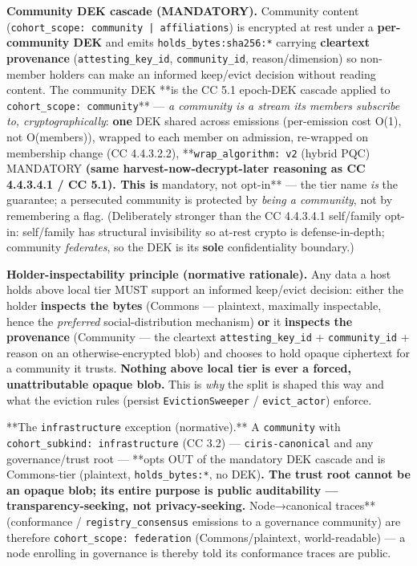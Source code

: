 \documentclass[11pt]{article}
\begin{document}
\textbf{Community DEK cascade (MANDATORY).} Community content (\texttt{cohort\_scope: community | affiliations}) is encrypted at rest under a \textbf{per-community DEK} and emits \texttt{holds\_bytes:sha256:*} carrying \textbf{cleartext provenance} (\texttt{attesting\_key\_id}, \texttt{community\_id}, reason/dimension) so non-member holders can make an informed keep/evict decision without reading content. The community DEK **is the CC 5.1 epoch-DEK cascade applied to \texttt{cohort\_scope: community}** — \textit{a community is a stream its members subscribe to, cryptographically}: \textbf{one} DEK shared across emissions (per-emission cost O(1), not O(members)), wrapped to each member on admission, re-wrapped on membership change (CC 4.4.3.2.2), **\texttt{wrap\_algorithm: v2} (hybrid PQC) MANDATORY\textbf{ (same harvest-now-decrypt-later reasoning as CC 4.4.3.4.1 / CC 5.1). This is }mandatory, not opt-in** — the tier name \textit{is} the guarantee; a persecuted community is protected by \textit{being a community}, not by remembering a flag. (Deliberately stronger than the CC 4.4.3.4.1 self/family opt-in: self/family has structural invisibility so at-rest crypto is defense-in-depth; community \textit{federates}, so the DEK is its \textbf{sole} confidentiality boundary.)


\textbf{Holder-inspectability principle (normative rationale).} Any data a host holds above local tier MUST support an informed keep/evict decision: either the holder \textbf{inspects the bytes} (Commons — plaintext, maximally inspectable, hence the \textit{preferred} social-distribution mechanism) \textbf{or} it \textbf{inspects the provenance} (Community — the cleartext \texttt{attesting\_key\_id} + \texttt{community\_id} + reason on an otherwise-encrypted blob) and chooses to hold opaque ciphertext for a community it trusts. \textbf{Nothing above local tier is ever a forced, unattributable opaque blob.} This is \textit{why} the split is shaped this way and what the eviction rules (persist \texttt{EvictionSweeper} / \texttt{evict\_actor}) enforce.


**The \texttt{infrastructure} exception (normative).** A \texttt{community} with \texttt{cohort\_subkind: infrastructure} (CC 3.2) — \texttt{ciris-canonical} and any governance/trust root — **opts OUT of the mandatory DEK cascade and is Commons-tier (plaintext, \texttt{holds\_bytes:*}, no DEK)\textbf{. The trust root cannot be an opaque blob; its entire purpose is public auditability — transparency-seeking, not privacy-seeking. }Node→canonical traces** (conformance / \texttt{registry\_consensus} emissions to a governance community) are therefore \texttt{cohort\_scope: federation} (Commons/plaintext, world-readable) — a node enrolling in governance is thereby told its conformance traces are public.
\end{document}
